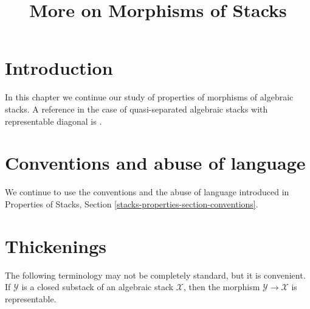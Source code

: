 \documentclass{stacks-project}
\theoremstyle{plain}
\theoremstyle{definition}
\theoremstyle{remark}
\numberwithin{equation}{subsection}
\begin{document}
\title{More on Morphisms of Stacks}


\maketitle

\label{section-phantom}

\tableofcontents

\section{Introduction}
\label{section-introduction}

\noindent
In this chapter we continue our study of properties of morphisms of algebraic
stacks. A reference in the case of quasi-separated algebraic stacks with
representable diagonal is \cite{LM-B}.




\section{Conventions and abuse of language}
\label{section-conventions}

\noindent
We continue to use the conventions and the abuse of language
introduced in
Properties of Stacks, Section \ref{stacks-properties-section-conventions}.






\section{Thickenings}
\label{section-thickenings}

\noindent
The following terminology may not be completely standard, but it is convenient.
If $\mathcal{Y}$ is a closed substack of an algebraic stack $\mathcal{X}$,
then the morphism $\mathcal{Y} \to \mathcal{X}$ is representable.
\end{document}

